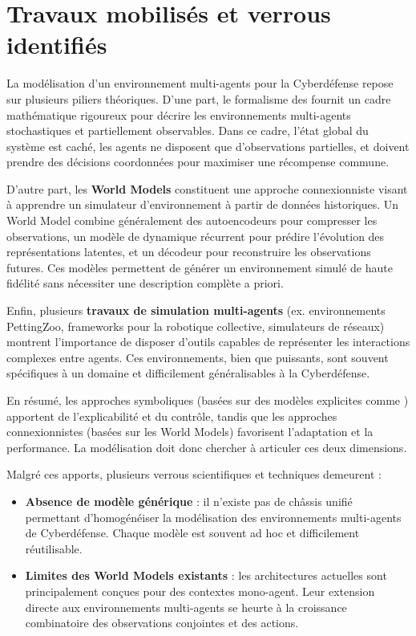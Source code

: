 \section{Travaux mobilisés et verrous identifiés}

La modélisation d'un environnement multi-agents pour la Cyberdéfense repose sur plusieurs piliers théoriques.
D'une part, le formalisme des \textbf{} fournit un cadre mathématique rigoureux pour décrire les environnements multi-agents stochastiques et partiellement observables.
Dans ce cadre, l'état global du système est caché, les agents ne disposent que d'observations partielles, et doivent prendre des décisions coordonnées pour maximiser une récompense commune.

D'autre part, les \textbf{World Models} constituent une approche connexionniste visant à apprendre un simulateur d'environnement à partir de données historiques.
Un World Model combine généralement des autoencodeurs pour compresser les observations, un modèle de dynamique récurrent pour prédire l'évolution des représentations latentes, et un décodeur pour reconstruire les observations futures.
Ces modèles permettent de générer un environnement simulé de haute fidélité sans nécessiter une description complète a priori.

Enfin, plusieurs \textbf{travaux de simulation multi-agents} (ex. environnements PettingZoo, frameworks pour la robotique collective, simulateurs de réseaux) montrent l'importance de disposer d'outils capables de représenter les interactions complexes entre agents.
Ces environnements, bien que puissants, sont souvent spécifiques à un domaine et difficilement généralisables à la Cyberdéfense.

En résumé, les approches symboliques (basées sur des modèles explicites comme \phantom{XXXX} ) apportent de l'explicabilité et du contrôle, tandis que les approches connexionnistes (basées sur les World Models) favorisent l'adaptation et la performance.
La modélisation doit donc chercher à articuler ces deux dimensions.

Malgré ces apports, plusieurs verrous scientifiques et techniques demeurent :
\begin{itemize}
  \item \textbf{Absence de modèle générique} : il n'existe pas de châssis unifié permettant d'homogénéiser la modélisation des environnements multi-agents de Cyberdéfense. Chaque modèle est souvent ad hoc et difficilement réutilisable.
  \item \textbf{Limites des World Models existants} : les architectures actuelles sont principalement conçues pour des contextes mono-agent. Leur extension directe aux environnements multi-agents se heurte à la croissance combinatoire des observations conjointes et des actions.
\end{itemize}

